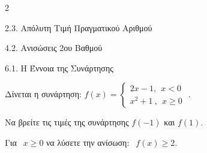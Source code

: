 \begin{ylh}{2}
    \item 2.3. Απόλυτη Τιμή Πραγματικού Αριθμού
    \item 4.2. Ανισώσεις 2ου Βαθμού
    \item 6.1. Η Έννοια της Συνάρτησης
\end{ylh}
Δίνεται η συνάρτηση: \(f(x) = \left\{ \begin{array}{r}
2x - 1,\ \ x < 0\  \\
x^{2} + 1\ ,\ \ x \geq 0
\end{array} \right.\ \).

\begin{alist}
\item Να βρείτε τις τιμές της συνάρτησης $f( - 1)$ και $f(1)$.
\item Για $\ \ x \geq 0$ να λύσετε την ανίσωση: $\ \ f(x) \geq 2$.
\end{alist}

